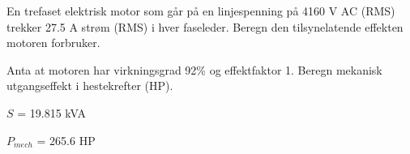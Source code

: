 

En trefaset elektrisk motor som går på en linjespenning på 4160 V AC (RMS) trekker 27.5 A strøm (RMS) i hver faseleder. Beregn den tilsynelatende effekten motoren forbruker.

\vskip 10pt

Anta at motoren har virkningsgrad 92\% og effektfaktor 1. Beregn mekanisk utgangseffekt i hestekrefter (HP).







$S$ = 19.815 kVA

\vskip 10pt

$P_{mech}$ = 265.6 HP











